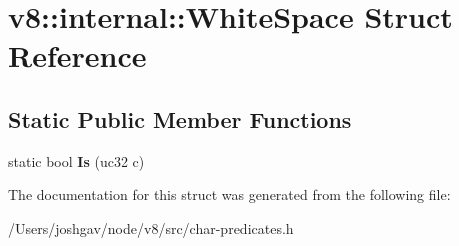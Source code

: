 \hypertarget{structv8_1_1internal_1_1_white_space}{}\section{v8\+:\+:internal\+:\+:White\+Space Struct Reference}
\label{structv8_1_1internal_1_1_white_space}
\subsection*{Static Public Member Functions}
\begin{DoxyCompactItemize}
\item 
static bool {\bfseries Is} (uc32 c)\hypertarget{structv8_1_1internal_1_1_white_space_a742f4c26248d45e46b14d19382b43747}{}\label{structv8_1_1internal_1_1_white_space_a742f4c26248d45e46b14d19382b43747}

\end{DoxyCompactItemize}


The documentation for this struct was generated from the following file\+:\begin{DoxyCompactItemize}
\item 
/\+Users/joshgav/node/v8/src/char-\/predicates.\+h\end{DoxyCompactItemize}
